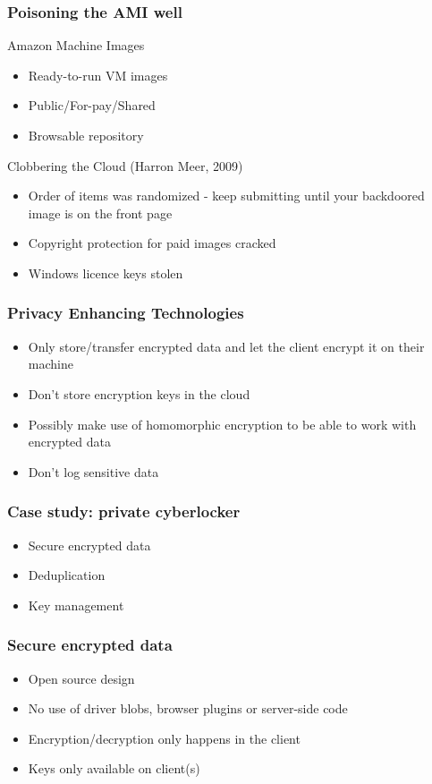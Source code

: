 \documentclass{beamer}
\begin{document}
\begin{frame}
    \frametitle{Poisoning the AMI well}
    Amazon Machine Images
    \begin{itemize}
      \item Ready-to-run VM images
      \item Public/For-pay/Shared
      \item Browsable repository
    \end{itemize}

    Clobbering the Cloud (Harron Meer, 2009)
    \begin{itemize}
      \item Order of items was randomized - keep submitting until your backdoored image is on the front page
      \item Copyright protection for paid images cracked
      \item Windows licence keys stolen
    \end{itemize}
\end{frame}

\begin{frame}
    \frametitle{Privacy Enhancing Technologies}
    \begin{itemize}
      \item Only store/transfer encrypted data and let the client encrypt it on their machine
      \item Don't store encryption keys in the cloud
      \item Possibly make use of homomorphic encryption to be able to work with encrypted data
      \item Don't log sensitive data
    \end{itemize}
\end{frame}

\begin{frame}
    \frametitle{Case study: private cyberlocker}
    \begin{itemize}
    \item Secure encrypted data
    \item Deduplication
    \item Key management
    \end{itemize}
\end{frame}

\begin{frame}
    \frametitle{Secure encrypted data}
    \begin{itemize}
    \item Open source design
    \item No use of driver blobs, browser plugins or server-side code
    \item Encryption/decryption only happens in the client
    \item Keys only available on client(s)
    \end{itemize}
\end{frame}
\end{document}
